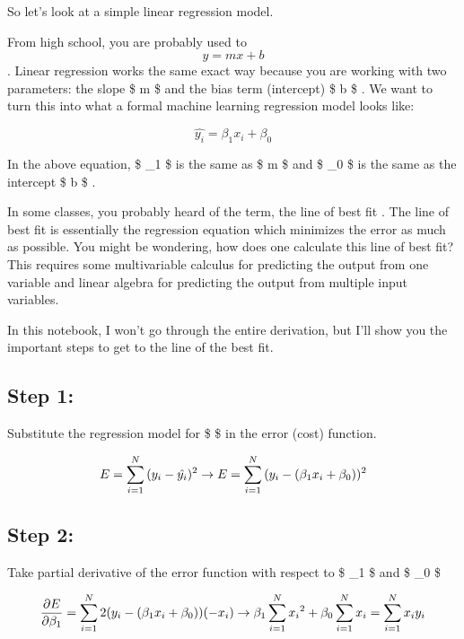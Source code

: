 \documentclass[11pt]{article}
\begin{document}
So let's look at a simple linear regression model.

From high school, you are probably used to \[ y = mx + b \] . Linear
regression works the same exact way because you are working with two
parameters: the slope \$ m \$ and the bias term (intercept) \$ b \$ . We
want to turn this into what a formal machine learning regression model
looks like:

\[ \hat{y_i} = \beta_1 x_i + \beta_0   \]

In the above equation, \$ \beta\_1 \$ is the same as \$ m \$ and \$
\beta\_0 \$ is the same as the intercept \$ b \$ .

In some classes, you probably heard of the term, the line of best fit .
The line of best fit is essentially the regression equation which
minimizes the error as much as possible. You might be wondering, how
does one calculate this line of best fit? This requires some
multivariable calculus for predicting the output from one variable and
linear algebra for predicting the output from multiple input variables.

In this notebook, I won't go through the entire derivation, but I'll
show you the important steps to get to the line of the best fit.

\hypertarget{step-1}{%
\subsection{Step 1:}\label{step-1}}

Substitute the regression model for \$  \$ in the error (cost)
function.

\[ E = \sum_{i=1}^{N}{(y_i - \hat{y_i})^2} \space \space  \space \space \space \space \rightarrow \space \space \space \space \space \space E = \sum_{i=1}^{N}{(y_i - (\beta_1 x_i + \beta_0))^2} \]

\hypertarget{step-2}{%
\subsection{Step 2:}\label{step-2}}

Take partial derivative of the error function with respect to \$
\beta\_1 \$ and \$ \beta\_0 \$

\[ \frac{\partial{E}}{\partial{\beta_1}} \space \space  \space \space \space \space = \space \space  \space \space \space \space \sum_{i=1}^{N}{2(y_i - (\beta_1 x_i + \beta_0))(-x_i)} \space \space  \space \space \space \space \rightarrow \space \space \space \space \space \space \beta_1 \sum_{i=1}^{N}{{x_i}^2} + \beta_0 \sum_{i=1}^{N}{x_i} = \sum_{i=1}^{N}{x_i y_i} \]
\end{document}

